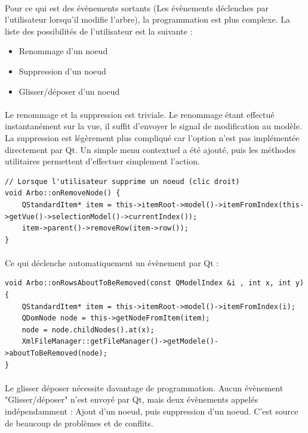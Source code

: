 \paragraph{}

Pour ce qui est des évènements sortants (Les évènements déclenches par l'utilisateur lorsqu'il modifie l'arbre), la programmation
est plus complexe. La liste des possibilités de l'utilisateur est la suivante :

\begin{itemize}
\item Renommage d'un noeud
\item Suppression d'un noeud
\item Glisser/déposer d'un noeud
\end{itemize}

\paragraph{}
Le renommage et la suppression est triviale. Le renommage étant effectué instantanément sur la vue, il suffit d'envoyer le signal de modification au modèle. La suppression est légèrement plus compliqué car l'option n'est pas implémentée directement par Qt. Un simple menu contextuel a été ajouté, puis les méthodes utilitaires permettent d'effectuer simplement l'action.

\begin{lstlisting}
// Lorsque l'utilisateur supprime un noeud (clic droit)
void Arbo::onRemoveNode() {
    QStandardItem* item = this->itemRoot->model()->itemFromIndex(this->getVue()->selectionModel()->currentIndex());
    item->parent()->removeRow(item->row());
}
\end{lstlisting}

\paragraph{}
Ce qui déclenche automatiquement un évènement par Qt :
\begin{lstlisting}
void Arbo::onRowsAboutToBeRemoved(const QModelIndex &i , int x, int y)
{
    QStandardItem* item = this->itemRoot->model()->itemFromIndex(i);
    QDomNode node = this->getNodeFromItem(item);
    node = node.childNodes().at(x);
    XmlFileManager::getFileManager()->getModele()->aboutToBeRemoved(node);
}
\end{lstlisting}

\paragraph{}
Le glisser déposer nécessite davantage de programmation. Aucun évènement "Glisser/déposer" n'est envoyé par Qt, mais deux évènements appelés indépendamment : Ajout d'un noeud, puis suppression d'un noeud. C'est source de beaucoup de problèmes et de conflits.


